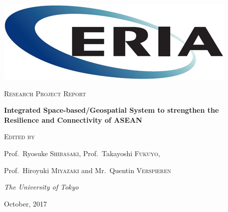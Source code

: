 \documentclass[10.5pt,listof=totoc]{report}
\begin{document}
\begin{CJK}{UTF8}{min}

\begin{titlepage}
	\centering
	\includegraphics[width=0.4\linewidth]{Figures/eria.jpg}\par
	\vspace{5 cm}
	{\scshape\large Research Project Report\par}
	\vspace{0.4cm}
	{\LARGE \bfseries Integrated Space-based/Geospatial System to strengthen the Resilience and Connectivity of ASEAN\par}
	\vspace{3 cm}
	{\scshape\large Edited by\par}
	\vspace{0.4cm}
	{\large Prof.~Ryosuke \textsc{Shibasaki}, Prof.~Takayoshi \textsc{Fukuyo},\par}
	{\large Prof.~Hiroyuki \textsc{Miyazaki} and Mr.~Quentin \textsc{Verspieren}\par}
	\vspace{0.2cm}
	{\large \itshape The University of Tokyo\par}
	\vfill
	{\large October, 2017\par}
\end{titlepage}




\cleardoublepage
{}


\cleardoublepage
{}


\cleardoublepage
{}


\tableofcontents

\cleardoublepage
{}
\listoffigures

\cleardoublepage
{}
\listoftables










\appendix




\singlespacing


\end{CJK}
\end{document}

